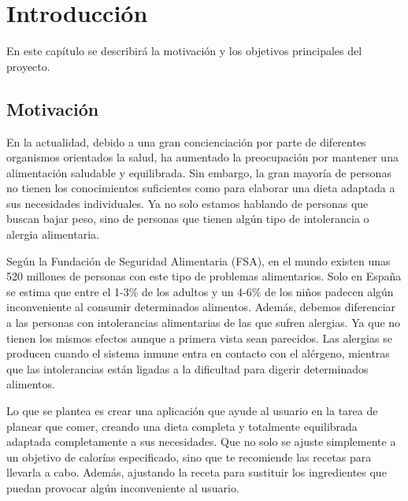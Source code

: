 \chapter{Introducción}
En este capítulo se describirá la motivación y los objetivos principales del proyecto.

\section{Motivación}
En la actualidad, debido a una gran concienciación por parte de diferentes organismos orientados la salud, ha aumentado la preocupación por mantener una alimentación saludable y equilibrada. Sin embargo, la gran mayoría de personas no tienen los conocimientos suficientes como para elaborar una dieta adaptada a sus necesidades individuales. Ya no solo estamos hablando de personas que buscan bajar peso, sino de personas que tienen algún tipo de intolerancia o alergia alimentaria. 

Según la Fundación de Seguridad Alimentaria (FSA), en el mundo existen unas 520 millones de personas con este tipo de problemas alimentarios. Solo en España se estima que entre el 1-3\% de los adultos y un 4-6\% de los niños padecen algún inconveniente al consumir determinados alimentos. Además, debemos diferenciar a las personas con intolerancias alimentarias de las que sufren alergias. Ya que no tienen los mismos efectos aunque a primera vista sean parecidos. Las alergias se producen cuando el sistema inmune entra en contacto con el alérgeno, mientras que las intolerancias están ligadas a la dificultad para digerir determinados alimentos.\cite{FSA}

Lo que se plantea es crear una aplicación que ayude al usuario en la tarea de planear que comer, creando una dieta completa y totalmente equilibrada adaptada completamente a sus necesidades. Que no solo se ajuste simplemente a un objetivo de calorías especificado, sino que te recomiende las recetas para llevarla a cabo. Además, ajustando la receta para sustituir los ingredientes que puedan provocar algún inconveniente al usuario.

